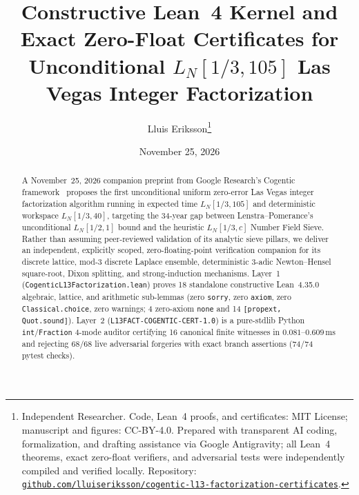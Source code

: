 \documentclass[10pt,twocolumn]{article}
\title{\vspace{-0.9em}\textbf{Constructive Lean~4 Kernel and Exact Zero-Float Certificates for Unconditional $L_N[1/3, 105]$ Las Vegas Integer Factorization}}
\author{Lluis Eriksson\thanks{Independent Researcher. Code, Lean~4 proofs, and certificates: MIT License; manuscript and figures: CC-BY-4.0. Prepared with transparent AI coding, formalization, and drafting assistance via Google Antigravity; all Lean~4 theorems, exact zero-float verifiers, and adversarial tests were independently compiled and verified locally. Repository: \href{https://github.com/lluiseriksson/cogentic-l13-factorization-certificates}{\nolinkurl{github.com/lluiseriksson/cogentic-l13-factorization-certificates}}.}}
\date{November 25, 2026}
\begin{document}
\maketitle
\vspace{-1.2em}

\begin{abstract}
A November~25, 2026 companion preprint from Google Research's Cogentic framework~\cite{cogentic2026l13factoring,cai2026cogentic} proposes the first unconditional uniform zero-error Las Vegas integer factorization algorithm running in expected time $L_N[1/3, 105]$ and deterministic workspace $L_N[1/3, 40]$, targeting the 34-year gap between Lenstra--Pomerance's unconditional $L_N[1/2, 1]$ bound and the heuristic $L_N[1/3, c]$ Number Field Sieve. Rather than assuming peer-reviewed validation of its analytic sieve pillars, we deliver an independent, explicitly scoped, zero-floating-point verification companion for its discrete lattice, mod-3 discrete Laplace ensemble, deterministic 3-adic Newton--Hensel square-root, Dixon splitting, and strong-induction mechanisms. Layer~1 (\nolinkurl{CogenticL13Factorization.lean}) proves 18 standalone constructive Lean~4.35.0 algebraic, lattice, and arithmetic sub-lemmas (zero \texttt{sorry}, zero \texttt{axiom}, zero \texttt{Classical.choice}, zero warnings; 4 zero-axiom \texttt{none} and 14 \texttt{[propext, Quot.sound]}). Layer~2 (\texttt{L13FACT-\allowbreak COGENTIC-\allowbreak CERT-1.0}) is a pure-stdlib Python \texttt{int}/\texttt{Fraction} 4-mode auditor certifying 16 canonical finite witnesses in $0.081$--$0.609\,\mathrm{ms}$ and rejecting 68/68 live adversarial forgeries with exact branch assertions (74/74 pytest checks).
\end{abstract}
\end{document}

